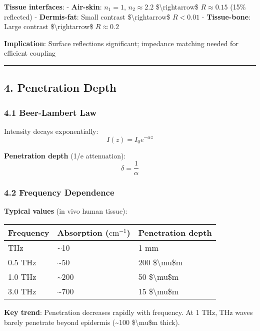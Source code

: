 \textbf{Tissue interfaces}: - \textbf{Air-skin}: \(n_1 = 1\),
\(n_2 \approx 2.2\) \$\textbackslash rightarrow\$ \(R \approx 0.15\)
(15\% reflected) - \textbf{Dermis-fat}: Small contrast
\$\textbackslash rightarrow\$ \(R < 0.01\) - \textbf{Tissue-bone}: Large
contrast \$\textbackslash rightarrow\$ \(R \approx 0.2\)

\textbf{Implication}: Surface reflections significant; impedance
matching needed for efficient coupling

\begin{center}\rule{0.5\linewidth}{0.5pt}\end{center}

\subsection{4. Penetration Depth}\label{penetration-depth}

\subsubsection{4.1 Beer-Lambert Law}\label{beer-lambert-law}

Intensity decays exponentially: \[I(z) = I_0 e^{-\alpha z}\]

\textbf{Penetration depth} (1/e attenuation):
\[\delta = \frac{1}{\alpha}\]

\subsubsection{4.2 Frequency Dependence}\label{frequency-dependence-1}

\textbf{Typical values} (in vivo human tissue):

{\def\LTcaptype{} %
\begin{longtable}[]{@{}lll@{}}
\toprule\noalign{}
Frequency & Absorption (\(\text{cm}^{-1}\)) & Penetration depth \\
\midrule\noalign{}
\endhead
\bottomrule\noalign{}
\endlastfoot
0.1 THz & \textasciitilde10 & 1 mm \\
0.5 THz & \textasciitilde50 & 200 \$\textbackslash mu\$m \\
1.0 THz & \textasciitilde200 & 50 \$\textbackslash mu\$m \\
3.0 THz & \textasciitilde700 & 15 \$\textbackslash mu\$m \\
\end{longtable}
}

\textbf{Key trend}: Penetration decreases rapidly with frequency. At 1
THz, THz waves barely penetrate beyond epidermis (\textasciitilde100
\$\textbackslash mu\$m thick).

